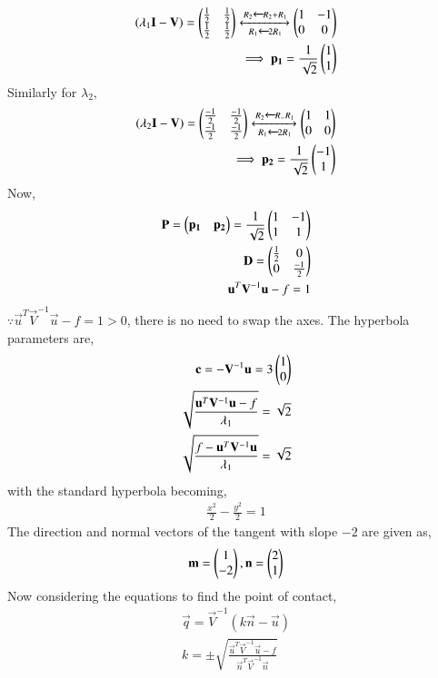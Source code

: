 \begin{align}
    (\lambda_1 \mathbf{I}-\mathbf{V}) = \begin{pmatrix}\frac{1}{2}&\frac{1}{2}\\\frac{1}{2}&\frac{1}{2}\end{pmatrix}
    \xleftrightarrow[R_1\xleftarrow{}2R_1]{R_2\xleftarrow{}R_2+R_1}
    \begin{pmatrix}1&-1\\0&0\end{pmatrix} \\
    \implies \mathbf{p_1} = \frac{1}{\sqrt{2}}\begin{pmatrix}1\\1\end{pmatrix}
\end{align}
Similarly for $\lambda_2$,
\begin{align}
    (\lambda_2 \mathbf{I}-\mathbf{V}) = \begin{pmatrix}\frac{-1}{2}&\frac{-1}{2}\\\frac{-1}{2}&\frac{-1}{2}\end{pmatrix}
    \xleftrightarrow[R_1\xleftarrow{}2R_1]{R_2\xleftarrow{}R_-R_1}
    \begin{pmatrix}1&1\\0&0\end{pmatrix} \\
    \implies \mathbf{p_2} = \frac{1}{\sqrt{2}}\begin{pmatrix}-1\\1\end{pmatrix}
\end{align}
Now, 
\begin{align}
    \mathbf{P} = \begin{pmatrix}\mathbf{p_1}&\mathbf{p_2}\end{pmatrix} = \frac{1}{\sqrt{2}}\begin{pmatrix}1&-1\\1&1\end{pmatrix} \\
    \mathbf{D} = \begin{pmatrix}\frac{1}{2}&0\\0&\frac{-1}{2}\end{pmatrix} \\
    \mathbf{u}^T\mathbf{V}^{-1}\mathbf{u}-f=1
\end{align}
$\because  \vec{u}^T\vec{V}^{-1}\vec{u}-f=1>0$, there is no need to swap the axes. The hyperbola parameters are, 
\begin{align}
    \mathbf{c} = -\mathbf{V}^{-1}\mathbf{u} = 3\begin{pmatrix}1\\0\end{pmatrix} \\
    \sqrt{\frac{\mathbf{u}^T\mathbf{V}^{-1}\mathbf{u}-f}{\lambda_1}}=\sqrt{2} \\
    \sqrt{\frac{f-\mathbf{u}^T\mathbf{V}^{-1}\mathbf{u}}{\lambda_1}}=\sqrt{2}
\end{align}
with the standard hyperbola becoming, 
\begin{align}
    \frac{x^2}{2}-\frac{y^2}{2}=1
\end{align}
The direction and normal vectors of the tangent with slope $-2$ are given as,
\begin{align}
    \mathbf{m}=\begin{pmatrix}1\\-2\end{pmatrix}, \mathbf{n}=\begin{pmatrix}2\\1\end{pmatrix}
\end{align}
Now considering the equations to find the point of contact, 
\begin{align}
    \vec{q}=\vec{V}^{-1}(k\vec{n}-\vec{u}) \\
    k = \pm \sqrt{\frac{\vec{u}^T\vec{V}^{-1}\vec{u}-f}{\vec{n}^T\vec{V}^{-1}\vec{n}}}
\end{align}
